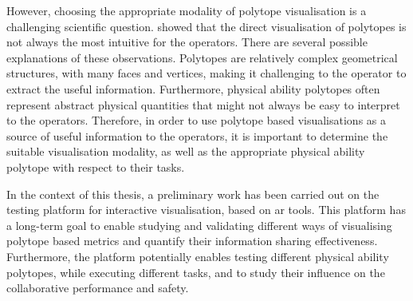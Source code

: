 However, choosing the appropriate modality of polytope visualisation is a challenging scientific question. \citet{Zolotas2021} showed that the direct visualisation of polytopes is not always the most intuitive for the operators. 
There are several possible explanations of these observations. Polytopes are relatively complex geometrical structures, with many faces and vertices, making it challenging to the operator to extract the useful information. Furthermore, physical ability polytopes often represent abstract physical quantities that might not always be easy to interpret to the operators. 
Therefore, in order to use polytope based visualisations as a source of useful information to the operators, it is important to determine the suitable visualisation modality, as well as the appropriate physical ability polytope with respect to their tasks. 

In the context of this thesis, a preliminary work has been carried out on the testing platform for interactive visualisation, based on \gls{ar} tools. This platform has a long-term goal to enable studying and validating different ways of visualising polytope based metrics and quantify their information sharing effectiveness. Furthermore, the platform potentially enables testing different physical ability polytopes, while executing different tasks, and to study their influence on the collaborative performance and safety.  


